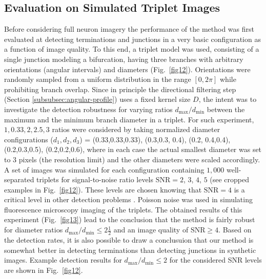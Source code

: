 \subsection{Evaluation on Simulated Triplet Images}
\label{subsec:experiments-triplets}
Before considering full neuron imagery the performance of the method was first evaluated at detecting terminations and junctions in a very basic configuration as a function of image quality. To this end, a triplet model was used, consisting of a single junction modeling a bifurcation, having three branches with arbitrary orientations (angular intervals) and diameters (Fig.~\ref{fig12}). Orientations were randomly sampled from a uniform distribution in the range $[0, 2\pi]$ while prohibiting branch overlap. Since in principle the directional filtering step (Section \ref{subsubsec:angular-profile}) uses a fixed kernel size $D$, the intent was to investigate the detection robustness for varying ratios $d_{\max}/d_{\min}$ between the maximum and the minimum branch diameter in a triplet. For such experiment, $1,0.33,2,2.5,3$ ratios were considered by taking normalized diameter configurations ($d_1,d_2,d_3$) = (0.33,0.33,0.33), (0.3,0.3, 0.4), (0.2, 0.4,0.4), (0.2,0.3,0.5), (0.2,0.2,0.6), where in each case the actual smallest diameter was set to 3 pixels (the resolution limit) and the other diameters were scaled accordingly. A set of images was simulated for each configuration containing $1,000$ well-separated triplets for signal-to-noise ratio levels $\textrm{SNR}=2$, $3$, $4$, $5$ (see cropped examples in Fig.~\ref{fig12}). These levels are chosen knowing that $\textrm{SNR}=4$ is a critical level in other detection problems \cite{smal2010quantitative, chenouard2014objective}. Poisson noise was used in simulating fluorescence microscopy imaging of the triplets. The obtained results of this experiment (Fig.~\ref{fig13}) lead to the conclusion that the method is fairly robust for diameter ratios $d_{\max}/d_{\min}\leq2\frac{1}{2}$ and an image quality of $\textrm{SNR} \geq 4$. Based on the detection rates, it is also possible to draw a conclusuion that our method is somewhat better in detecting terminations than detecting junctions in synthetic images. Example detection results for $d_{\max}/d_{\min}\leq2$ for the considered SNR levels are shown in Fig.~\ref{fig12}.

